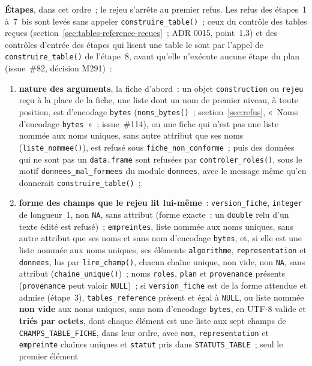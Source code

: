 \documentclass[a4paper,11pt]{article}
\newcommand{\code}[1]{\texttt{\small #1}}
\begin{document}
\medskip
\noindent
\textbf{Étapes}, dans cet ordre~; le rejeu s'arrête au premier refus. Les
refus des étapes~1 à~7~bis sont levés sans appeler
\code{construire\_table()}~; ceux du contrôle des tables reçues
(section~\ref{sec:tables-reference-recues}~; ADR 0015, point~1.3) et des contrôles d'entrée des étapes qui lisent une table
le sont par l'appel de \code{construire\_table()} de l'étape~8, avant
qu'elle n'exécute aucune étape du plan (issue~\#82, décision M291)~:
\begin{enumerate}[leftmargin=*, itemsep=2pt]
  \item \textbf{nature des arguments}, la fiche d'abord~: un objet
    \code{construction} ou \code{rejeu} reçu à la place de la fiche, une
    liste dont un nom de premier niveau, à toute position, est d'encodage
    \code{bytes} (\code{noms\_bytes()}~; section~\ref{sec:refus}, «~Noms
    d'encodage \code{bytes}~»~; issue~\#114), ou une
    fiche qui n'est pas une liste nommée aux noms uniques, sans autre
    attribut que ses noms (\code{liste\_nommee()}), est refusé sous
    \code{fiche\_non\_conforme}~; puis des données qui ne sont pas un
    \code{data.frame} sont refusées par \code{controler\_roles()}, sous le
    motif \code{donnees\_mal\_formees} du module \code{donnees}, avec le
    message même qu'en donnerait \code{construire\_table()}~;
  \item \textbf{forme des champs que le rejeu lit lui-même}~:
    \code{version\_fiche}, \code{integer} de longueur~1, non \code{NA}, sans
    attribut (forme exacte~: un \code{double} relu d'un texte édité est
    refusé)~; \code{empreintes}, liste nommée aux noms uniques, sans autre
    attribut que ses noms et sans nom d'encodage \code{bytes}, et, si elle
    est une liste nommée aux noms uniques, ses éléments
    \code{algorithme}, \code{representation} et \code{donnees}, lus par
    \code{lire\_champ()}, chacun
    chaîne unique, non vide, non \code{NA}, sans attribut
    (\code{chaine\_unique()})~; noms \code{roles}, \code{plan} et
    \code{provenance} présents (\code{provenance} peut valoir
    \code{NULL})~; si \code{version\_fiche} est de la forme attendue et
    admise (étape~3), \code{tables\_reference} présent et égal à
    \code{NULL}, ou liste nommée \textbf{non vide} aux noms uniques, sans nom
    d'encodage \code{bytes}, en UTF-8 valide et \textbf{triés par octets},
    dont chaque élément est une liste aux sept champs de
    \code{CHAMPS\_TABLE\_FICHE}, dans leur ordre, avec \code{nom},
    \code{representation} et \code{empreinte} chaînes uniques et
    \code{statut} pris dans \code{STATUTS\_TABLE}~; seul le premier élément

\end{enumerate}
\end{document}
